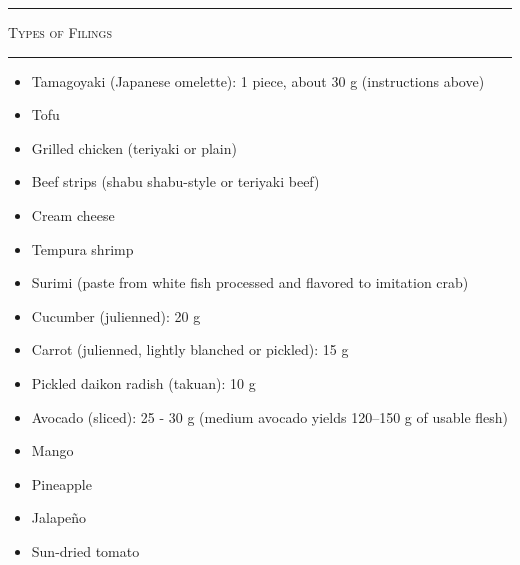 \documentclass[landscape, a4paper]{article}
\begin{document}
\begin{minipage}[t]{0.31\textwidth}
	\textcolor{PrimaryColor}{
		\rule{\linewidth}{0.5mm}
		\vspace{-0.1cm}
		\begin{center}
			\large
			\textsc{Types of Filings}
		\end{center}
		\rule{\linewidth}{0.5mm}
	}

	\begin{minipage}[t]{0.48\textwidth}
		\begin{itemize}
			\item Tamagoyaki (Japanese omelette): 1 piece, about 30 g (instructions above)
			\item Tofu
			\item Grilled chicken (teriyaki or plain)
			\item Beef strips (shabu shabu-style or teriyaki beef)
			\item Cream cheese
			\item Tempura shrimp
			\item Surimi (paste from white fish processed and flavored to imitation crab)
		\end{itemize}
	\end{minipage}
	\hfill
	\begin{minipage}[t]{0.48\textwidth}
		\begin{itemize}
			\item Cucumber (julienned): 20 g
			\item Carrot (julienned, lightly blanched or pickled): 15 g
			\item Pickled daikon radish (takuan): 10 g
			\item Avocado (sliced): 25 - 30 g (medium avocado yields 120–150 g of usable flesh)
			\item Mango
			\item Pineapple
			\item Jalapeño
			\item Sun-dried tomato
		\end{itemize}
	\end{minipage}

\end{minipage}%
\end{document}

